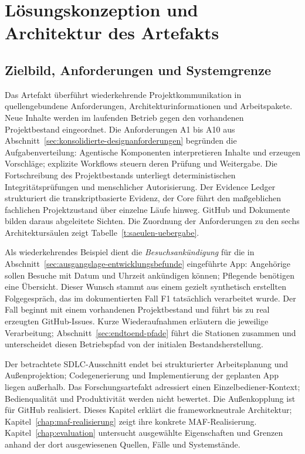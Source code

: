 
\chapter{Lösungskonzeption und Architektur des Artefakts}
\label{chap:loesungsarchitektur}

\section{Zielbild, Anforderungen und Systemgrenze}
\label{sec:zielbild-anforderungen-systemgrenze}

Das Artefakt überführt wiederkehrende Projektkommunikation in
quellengebundene Anforderungen, Architekturinformationen und
Arbeitspakete. Neue Inhalte werden im laufenden Betrieb gegen den
vorhandenen Projektbestand eingeordnet. Die Anforderungen A1 bis A10
aus Abschnitt~\ref{sec:konsolidierte-designanforderungen} begründen
die Aufgabenverteilung: Agentische Komponenten interpretieren
Inhalte und erzeugen Vorschläge; explizite Workflows steuern deren
Prüfung und Weitergabe. Die Fortschreibung des Projektbestands
unterliegt deterministischen Integritätsprüfungen und menschlicher
Autorisierung. Der Evidence Ledger strukturiert die
transkriptbasierte Evidenz, der Core führt den maßgeblichen
fachlichen Projektzustand über einzelne Läufe hinweg. GitHub und
Dokumente bilden daraus abgeleitete Sichten. Die Zuordnung der
Anforderungen zu den sechs Architektursäulen zeigt
Tabelle~\ref{t:saeulen-uebergabe}.

Als wiederkehrendes Beispiel dient die \emph{Besuchsankündigung}
für die in Abschnitt~\ref{sec:ausgangslage-entwicklungsbefunde}
eingeführte App: Angehörige sollen Besuche mit Datum und Uhrzeit
ankündigen können; Pflegende benötigen eine Übersicht. Dieser
Wunsch stammt aus einem gezielt synthetisch erstellten Folgegespräch,
das im dokumentierten Fall F1 tatsächlich verarbeitet wurde. Der
Fall beginnt mit einem vorhandenen Projektbestand und führt bis zu
real erzeugten GitHub-Issues. Kurze Wiederaufnahmen erläutern die
jeweilige Verarbeitung; Abschnitt~\ref{sec:endtoend-pfade} führt die
Stationen zusammen und unterscheidet diesen Betriebspfad von der
initialen Bestandsherstellung.

Der betrachtete SDLC-Ausschnitt endet bei strukturierter
Arbeitsplanung und Außenprojektion; Codegenerierung und
Implementierung der geplanten App liegen außerhalb.
Das Forschungsartefakt adressiert einen Einzelbediener-Kontext;
Bedienqualität und Produktivität werden nicht bewertet. Die
Außenkopplung ist für GitHub realisiert. Dieses Kapitel erklärt
die frameworkneutrale Architektur; Kapitel~\ref{chap:maf-realisierung}
zeigt ihre konkrete MAF-Realisierung. Kapitel~\ref{chap:evaluation}
untersucht ausgewählte Eigenschaften und Grenzen anhand der dort
ausgewiesenen Quellen, Fälle und Systemstände.
